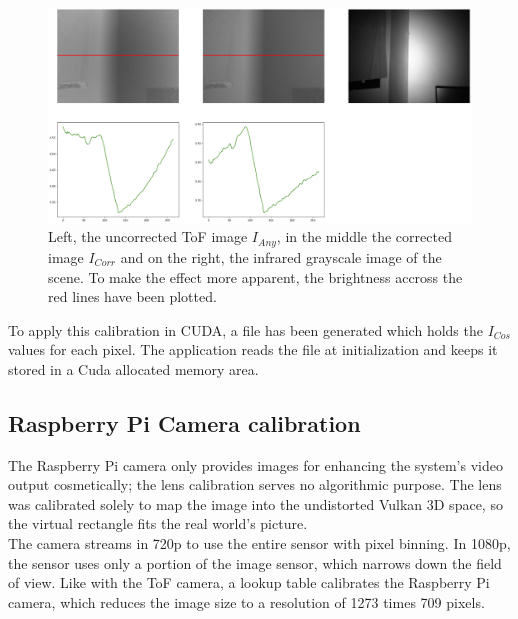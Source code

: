 \begin{figure}[H]
    \centering
    \includegraphics[width=1.0\textwidth]{images/flattened_tof_example.png}
    \caption{Left, the uncorrected ToF image $I_{Any}$, in the middle the corrected image $I_{Corr}$ and on the right, the infrared grayscale image of the scene. To make the effect more apparent, the brightness accross the red lines have been plotted.}
    \label{im:ToFCorrected}
\end{figure}
To apply this calibration in CUDA, a file has been generated which holds the $I_{Cos}$ values for each pixel. The application reads the file at initialization and keeps it stored in a Cuda allocated memory area. 
\subsection{Raspberry Pi Camera calibration}
\label{sec:RBPiCalibration}
The Raspberry Pi camera only provides images for enhancing the system's video output cosmetically; the lens calibration serves no algorithmic purpose. The lens was calibrated solely to map the image into the undistorted Vulkan 3D space, so the virtual rectangle fits the real world's picture.\\
The camera streams in 720p to use the entire sensor with pixel binning. In 1080p, the sensor uses only a portion of the image sensor, which narrows down the field of view. Like with the ToF camera, a lookup table calibrates the Raspberry Pi camera, which reduces the image size to a resolution of 1273 times 709 pixels.

